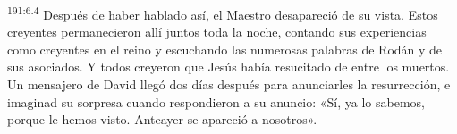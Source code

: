 \par 
\textsuperscript{191:6.4} Después de haber hablado así, el Maestro desapareció de su vista. Estos creyentes permanecieron allí juntos toda la noche, contando sus experiencias como creyentes en el reino y escuchando las numerosas palabras de Rodán y de sus asociados. Y todos creyeron que Jesús había resucitado de entre los muertos. Un mensajero de David llegó dos días después para anunciarles la resurrección, e imaginad su sorpresa cuando respondieron a su anuncio: «Sí, ya lo sabemos, porque le hemos visto. Anteayer se apareció a nosotros».